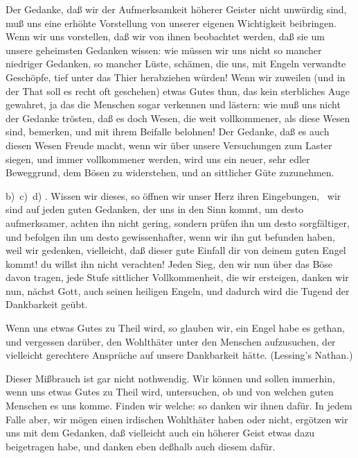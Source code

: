 \begin{aufza}
\begin{aufzb}
\item {} Der Gedanke, daß wir der Aufmerksamkeit höherer Geister nicht unwürdig sind, muß uns eine erhöhte Vorstellung von unserer eigenen Wichtigkeit beibringen. Wenn wir uns vorstellen, daß wir von ihnen beobachtet werden, daß sie um unsere geheimsten Gedanken wissen: wie müssen wir uns nicht so mancher niedriger Gedanken, so mancher Lüste, schämen, die uns, mit Engeln verwandte Geschöpfe, tief unter das Thier herabziehen würden! Wenn wir zuweilen (und in der That soll es recht oft geschehen) etwas Gutes thun, das kein sterbliches Auge gewahret, ja das die Menschen sogar verkennen und lästern: wie muß uns nicht der Gedanke trösten, daß es doch Wesen, die weit vollkommener, als diese Wesen sind, bemerken, und mit ihrem Beifalle belohnen! Der Gedanke, daß es auch diesen Wesen Freude macht, wenn wir über unsere Versuchungen zum Laster siegen, und immer vollkommener werden, wird uns ein neuer, sehr edler Beweggrund, dem Bösen zu widerstehen, und an sittlicher Güte zuzunehmen.
\item[b)\ c)\ d)] . Wissen wir dieses, so öffnen wir unser Herz ihren Eingebungen, \dh\ wir sind auf jeden guten Gedanken, der uns in den Sinn kommt, um desto aufmerksamer, achten ihn nicht gering, sondern prüfen ihn um desto sorgfältiger, und befolgen ihn um desto gewissenhafter, wenn wir ihn gut befunden haben, weil wir gedenken, vielleicht, daß dieser gute Einfall dir von deinem guten Engel kommt! du willst ihn nicht verachten! Jeden Sieg, den wir nun über das Böse davon tragen, jede Stufe sittlicher Vollkommenheit, die wir ersteigen, danken wir nun, nächst Gott, auch seinen heiligen Engeln, und dadurch wird die Tugend der Dankbarkeit geübt.\par
{} Wenn uns etwas Gutes zu Theil wird, so glauben wir, ein Engel habe es gethan, und vergessen darüber, den Wohlthäter unter den Menschen aufzusuchen, der vielleicht gerechtere Ansprüche auf unsere Dankbarkeit hätte. (Lessing's Nathan.)\par
{} Dieser Mißbrauch ist gar nicht nothwendig. Wir können und sollen immerhin, wenn uns etwas Gutes zu Theil wird, untersuchen, ob und von welchen guten Menschen es uns komme. Finden wir welche: so danken wir ihnen dafür. In jedem Falle aber, wir mögen einen irdischen Wohlthäter haben oder nicht, ergötzen wir uns mit dem Gedanken, daß vielleicht auch ein höherer Geist etwas dazu beigetragen habe, und danken eben deßhalb auch diesem dafür.

\end{aufzb}
\end{aufza}

